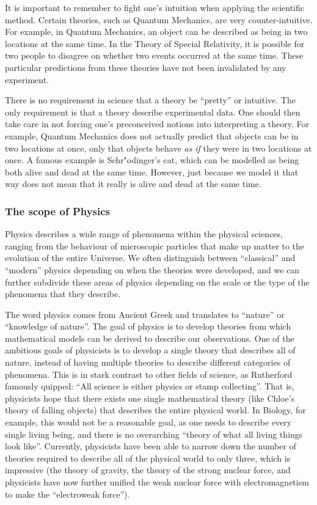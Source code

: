 It is important to remember to fight one's intuition when applying the scientific method. Certain theories, such as Quantum Mechanics, are very counter-intuitive. For example, in Quantum Mechanics, an object can be described as being in two locations at the same time. In the Theory of Special Relativity, it is possible for two people to disagree on whether two events occurred at the same time. These particular predictions from these theories have not been invalidated by any experiment.

There is no requirement in science that a theory be ``pretty'' or intuitive. The only requirement is that a theory describe experimental data. One should then take care in not forcing one's preconceived notions into interpreting a theory. For example, Quantum Mechanics does not actually predict that objects can be in two locations at once, only that objects behave \textit{as if} they were in two locations at once. A famous example is Schr"odinger's cat, which can be modelled as being both alive and dead at the same time. However, just because we model it that way does not mean that it really is alive and dead at the same time.

\subsubsection{The scope of Physics}

Physics describes a wide range of phenomena within the physical sciences, ranging from the behaviour of microscopic particles that make up matter to the evolution of the entire Universe. We often distinguish between ``classical'' and ``modern'' physics depending on when the theories were developed, and we can further subdivide these areas of physics depending on the scale or the type of the phenomena that they describe.

The word physics comes from Ancient Greek and translates to ``nature'' or ``knowledge of nature''. The goal of physics is to develop theories from which mathematical models can be derived to describe our observations. One of the ambitious goals of physicists is to develop a single theory that describes all of nature, instead of having multiple theories to describe different categories of phenomena. This is in stark contrast to other fields of science, as Rutherford famously quipped: ``All science is either physics or stamp collecting''. That is, physicists hope that there exists one single mathematical theory (like Chloe's theory of falling objects) that describes the entire physical world. In Biology, for example, this would not be a reasonable goal, as one needs to describe every single living being, and there is no overarching ``theory of what all living things look like''. Currently, physicists have been able to narrow down the number of theories required to describe all of the physical world to only three, which is impressive (the theory of gravity, the theory of the strong nuclear force, and physicists have now further unified the weak nuclear force with electromagnetism to make the ``electroweak force'').

